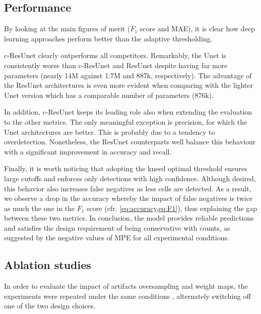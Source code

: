 \subsection{Performance}

By looking at the main figures of merit ($F_1$ score and MAE), it is clear how deep learning approaches perform better than the adaptive thresholding.

c-ResUnet clearly outperforms all competitors.
Remarkably, the Unet is consistently worse than c-ResUnet and ResUnet despite having far more parameters (nearly 14M against 1.7M and 887k, respectively).
The advantage of the ResUnet architectures is even more evident when comparing with the lighter Unet version which has a comparable number of parameters (876k).

In addition, c-ResUnet keeps its leading role also when extending the evaluation to the other metrics.
The only meaningful exception is precision, for which the Unet architectures are better. This is probably due to a tendency to overdetection. 
Nonetheless, the ResUnet counterparts well balance this behaviour with a significant improvement in accuracy and recall.

Finally, it is worth noticing that adopting the kneed optimal threshold ensures large cutoffs and enforces only detections with high confidence.
Although desired, this behavior also increases false negatives as less cells are detected. 
As a result, we observe a drop in the accuracy whereby the impact of false negatives is twice as much the one in the $F_1$ score (cfr. \cref{eq:accuracy,eq:F1}), thus explaining the gap between these two metrics.
In conclusion, the model provides reliable predictions and satisfies the design requirement of being conservative with counts, as suggested by the negative values of MPE for all experimental conditions.

\subsection{Ablation studies}

In order to evaluate the impact of artifacts oversampling and weight maps, the experiments were repeated under the same conditions%
, alternately switching off one of the two design choices.

